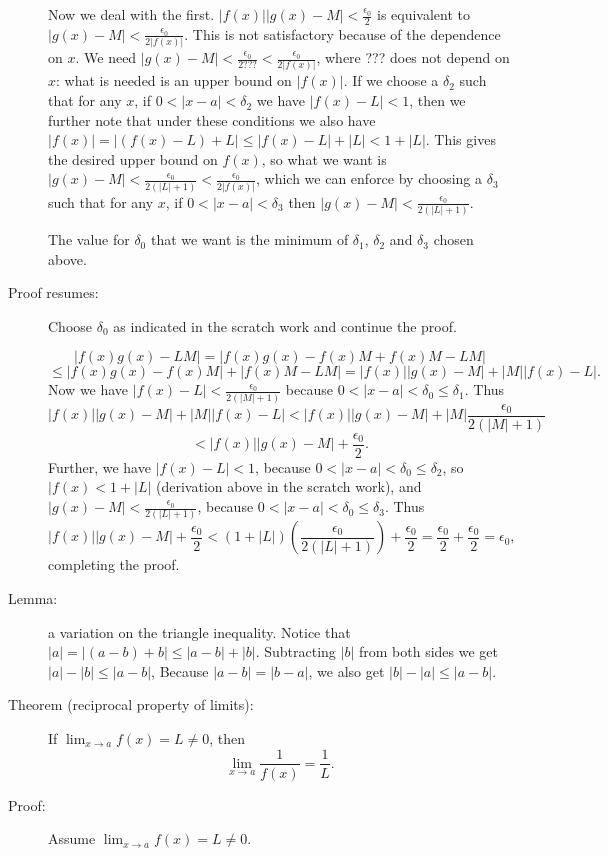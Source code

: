 \documentclass[12pt]{article}
\begin{document}
\begin{description}
Now we deal with the first.  $|f(x)||g(x)-M|<\frac{\epsilon_0}2$ is equivalent to
$|g(x)-M|<\frac{\epsilon_0}{2|f(x)|}$.  This is not satisfactory because of the dependence on $x$.  We need $|g(x)-M|<\frac{\epsilon_0}{2???}<\frac{\epsilon_0}{2|f(x)|}$, where ??? does not depend on $x$:  what is needed is an upper bound on $|f(x)|$.  If we choose a $\delta_2$ such that
for any $x$, if $0<|x-a|<\delta_2$ we have $|f(x)-L|<1$, then we further note that
under these conditions we also have $|f(x)|=|(f(x)-L)+L|\leq |f(x)-L|+|L|<1+|L|$.
This gives the desired upper bound on $f(x)$, so what we want is  $|g(x)-M|<\frac{\epsilon_0}{2(|L|+1)}<\frac{\epsilon_0}{2|f(x)|}$, which we can enforce by choosing a $\delta_3$ such that for any $x$, if $0<|x-a|<\delta_3$ then $|g(x)-M|<\frac{\epsilon_0}{2(|L|+1)}$.

The value for $\delta_0$ that we want is the minimum of $\delta_1$, $\delta_2$
and $\delta_3$ chosen above.

\item[Proof resumes:]

Choose $\delta_0$ as indicated in the scratch work and continue the proof.

$$|f(x)g(x)-LM| = |f(x)g(x)-f(x)M+f(x)M-LM|$$ $$\leq |f(x)g(x)-f(x)M| + |f(x)M-LM|
= |f(x)||g(x)-M| + |M||f(x)-L|.$$  Now we have $|f(x)-L|<\frac{\epsilon_0}{2(|M|+1)}$ because $0<|x-a|<\delta_0 \leq \delta_1$. \newpage  Thus $$|f(x)||g(x)-M| + |M||f(x)-L| < |f(x)||g(x)-M| + |M|\frac{\epsilon_0}{2(|M|+1)}$$ $$ < |f(x)||g(x)-M| + \frac{\epsilon_0}2.$$  Further, we have $|f(x)-L|<1$, because $0<|x-a|<\delta_0 \leq \delta_2$, so $|f(x)<1+|L|$ (derivation above in the scratch work), and $|g(x)-M|<\frac{\epsilon_0}{2(|L|+1)}$, because $0<|x-a|<\delta_0\leq \delta_3$.
Thus $$|f(x)||g(x)-M| + \frac{\epsilon_0}2<(1+|L|)(\frac{\epsilon_0}{2(|L|+1)})+ \frac{\epsilon_0}2 = \frac{\epsilon_0}2+\frac{\epsilon_0}2=\epsilon_0,$$ completing the proof.

\item[Lemma:]  a variation on the triangle inequality.  Notice that $|a| = |(a-b)+b|\leq |a-b|+|b|$.  Subtracting $|b|$ from both sides we get $|a|-|b| \leq |a-b|$,
Because $|a-b|=|b-a|$, we also get $|b|-|a|\leq |a-b|$.

\item[Theorem (reciprocal property of limits):]   If $\lim_{x \rightarrow a}f(x)=L \neq 0$, then $$\lim_{x \rightarrow a}\frac1{f(x)}=\frac1L.$$

\item[Proof:]  Assume $\lim_{x \rightarrow a}f(x)=L \neq 0$.


\end{description}
\end{document}

